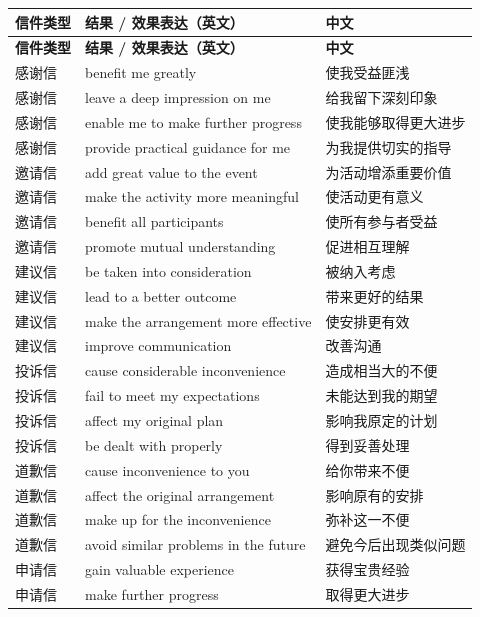 \documentclass[11pt,a4paper]{ctexart}
\begin{document}
\begin{longtable}{L{1.8cm}L{9.5cm}L{4.4cm}}
\toprule
\textbf{信件类型} & \textbf{结果 / 效果表达（英文）} & \textbf{中文} \\
\midrule
\endfirsthead
\toprule
\textbf{信件类型} & \textbf{结果 / 效果表达（英文）} & \textbf{中文} \\
\midrule
\endhead
\bottomrule
\endlastfoot

感谢信 & benefit me greatly & 使我受益匪浅 \\
感谢信 & leave a deep impression on me & 给我留下深刻印象 \\
感谢信 & enable me to make further progress & 使我能够取得更大进步 \\
感谢信 & provide practical guidance for me & 为我提供切实的指导 \\
\midrule
邀请信 & add great value to the event & 为活动增添重要价值 \\
邀请信 & make the activity more meaningful & 使活动更有意义 \\
邀请信 & benefit all participants & 使所有参与者受益 \\
邀请信 & promote mutual understanding & 促进相互理解 \\
\midrule
建议信 & be taken into consideration & 被纳入考虑 \\
建议信 & lead to a better outcome & 带来更好的结果 \\
建议信 & make the arrangement more effective & 使安排更有效 \\
建议信 & improve communication & 改善沟通 \\
\midrule
投诉信 & cause considerable inconvenience & 造成相当大的不便 \\
投诉信 & fail to meet my expectations & 未能达到我的期望 \\
投诉信 & affect my original plan & 影响我原定的计划 \\
投诉信 & be dealt with properly & 得到妥善处理 \\
\midrule
道歉信 & cause inconvenience to you & 给你带来不便 \\
道歉信 & affect the original arrangement & 影响原有的安排 \\
道歉信 & make up for the inconvenience & 弥补这一不便 \\
道歉信 & avoid similar problems in the future & 避免今后出现类似问题 \\
\midrule
申请信 & gain valuable experience & 获得宝贵经验 \\
申请信 & make further progress & 取得更大进步 \\

\end{longtable}
\end{document}
